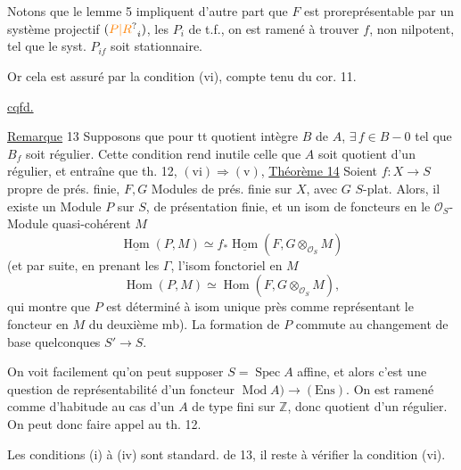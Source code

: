 Notons que le lemme 5  impliquent d'autre part que $F$ est  proreprésentable par un système projectif  $(\unsure{P|R}_i)$, les $P_i$ de t.f., on est ramené à trouver $f$, non nilpotent, tel que le syst. $P_{if}$ soit stationnaire.

Or cela est assuré par la  condition (vi), compte tenu du cor. 11.

\begin{center}\uline{cqfd.}\end{center}

\uline{Remarque} 13 Supposons que pour tt quotient intègre $B$ de $A$, $\exists\,f\in B-0$ tel que $B_f$ soit régulier. Cette condition rend  inutile celle que $A$ soit quotient d'un régulier, et entraîne que  th. 12, $(\mathrm{vi})\Longrightarrow(\mathrm v)$, 
\uline{Théorème 14} Soient $f:X\longrightarrow S$ propre de prés. finie, $F,G$ Modules de prés. finie sur $X$, avec $G$ $S$-plat. Alors,  il existe un Module $P$ sur $S$, de présentation finie, et un isom de foncteurs en le $\mathcal O_S$-Module quasi-cohérent $M$
\[
 \underline{\operatorname{Hom}}(P,M)\simeq
 f_*\underline{\operatorname{Hom}}(F,G\otimes_{\mathcal O_S} M)
\]
(et par suite, en prenant les $\Gamma$, l'isom fonctoriel en $M$
\[
 \operatorname{Hom}(P,M)\simeq\operatorname{Hom}(F,G\otimes_{\mathcal O_S}M),
\]
qui montre que $P$ est déterminé à isom unique près comme représentant le foncteur en $M$ du deuxième mb). La formation de $P$ commute au changement de base quelconques $S'\longrightarrow S$.

On voit facilement qu'on peut supposer $S=\operatorname{Spec}A$ affine, et alors c'est une question de représentabilité d'un foncteur $\operatorname{Mod} A)\longrightarrow(\mathrm{Ens})$. On est ramené comme d'habitude au cas d'un $A$ de type fini sur $\mathbb Z$, donc quotient d'un régulier. On peut donc faire appel au th. 12.

Les conditions (i) à (iv) sont standard.   de  13, il reste à vérifier la condition (vi).

